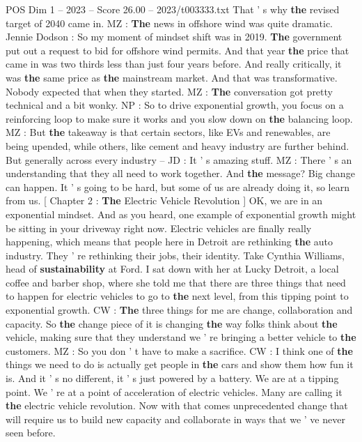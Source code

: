 \begin{textsample}{POS Dim 1 – 2023 – Score 26.00 – 2023/t003333.txt}
That ' s why \textbf{the} revised target of 2040 came in.
MZ : \textbf{The} news in offshore wind was quite dramatic.
Jennie Dodson : So my moment of mindset shift was in 2019. \textbf{The} government put out a request to bid for offshore wind permits.
And that year \textbf{the} price that came in was two thirds less than just four years before.
And really critically, it was \textbf{the} same price as \textbf{the} mainstream market.
And that was transformative.
Nobody expected that when they started.
MZ : \textbf{The} conversation got pretty technical and a bit wonky.
NP : So to drive exponential growth, you focus on a reinforcing loop to make sure it works and you slow down on \textbf{the} balancing loop.
MZ : But \textbf{the} takeaway is that certain sectors, like EVs and renewables, are being upended, while others, like cement and heavy industry are further behind.
But generally across every industry -- JD : It ' s amazing stuff.
MZ : There ' s an understanding that they all need to work together.
And \textbf{the} message?
Big change can happen.
It ' s going to be hard, but some of us are already doing it, so learn from us. [ Chapter 2 : \textbf{The} Electric Vehicle Revolution ] OK, we are in an exponential mindset.
And as you heard, one example of exponential growth might be sitting in your driveway right now.
Electric vehicles are finally really happening, which means that people here in Detroit are rethinking \textbf{the} auto industry.
They ' re rethinking their jobs, their identity.
Take Cynthia Williams, head of \textbf{sustainability} at Ford.
I sat down with her at Lucky Detroit, a local coffee and barber shop, where she told me that there are three things that need to happen for electric vehicles to go to \textbf{the} next level, from this tipping point to exponential growth.
CW : \textbf{The} three things for me are change, collaboration and capacity.
So \textbf{the} change piece of it is changing \textbf{the} way folks think about \textbf{the} vehicle, making sure that they understand we ' re bringing a better vehicle to \textbf{the} customers.
MZ : So you don ' t have to make a sacrifice.
CW : I think one of \textbf{the} things we need to do is actually get people in \textbf{the} cars and show them how fun it is.
And it ' s no different, it ' s just powered by a battery.
We are at a tipping point.
We ' re at a point of acceleration of electric vehicles.
Many are calling it \textbf{the} electric vehicle revolution.
Now with that comes unprecedented change that will require us to build new capacity and collaborate in ways that we ' ve never seen before.

\end{textsample}
